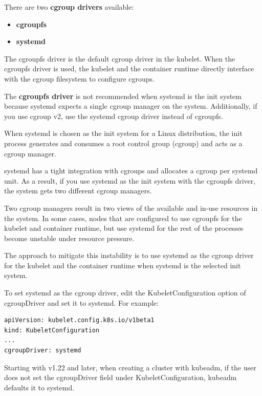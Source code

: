 \documentclass{article}
\newenvironment{blocktemplateII}[1]{%
    \tcolorbox[beamer,%
    noparskip,breakable,
    colframe=Green,%
    colbacklower=LimeGreen!75!LightGreen,%
    title=#1]}%
    {\endtcolorbox}
\newenvironment{codetemplate}[1][]{%
  \mybasecolorbox[#1]
  \itshape
}{%
  \endmybasecolorbox
}
\begin{document}
There are two \textbf{cgroup drivers} available:
\begin{itemize}
    \item \textbf{cgroupfs}
    \item \textbf{systemd}
\end{itemize}

The cgroupfs driver is the default cgroup driver in the kubelet. When the cgroupfs driver is used, the kubelet and the container runtime directly interface with the cgroup filesystem to configure cgroups.

The \textbf{cgroupfs driver} is not recommended when systemd is the init system because systemd expects a single cgroup manager on the system. Additionally, if you use cgroup v2, use the systemd cgroup driver instead of cgroupfs.

When systemd is chosen as the init system for a Linux distribution, the init process generates and consumes a root control group (cgroup) and acts as a cgroup manager.

systemd has a tight integration with cgroups and allocates a cgroup per systemd unit. As a result, if you use systemd as the init system with the cgroupfs driver, the system gets two different cgroup managers.

Two cgroup managers result in two views of the available and in-use resources in the system. In some cases, nodes that are configured to use cgroupfs for the kubelet and container runtime, but use systemd for the rest of the processes become unstable under resource pressure.

The approach to mitigate this instability is to use systemd as the cgroup driver for the kubelet and the container runtime when systemd is the selected init system.

To set systemd as the cgroup driver, edit the KubeletConfiguration option of cgroupDriver and set it to systemd. For example:

\begin{codetemplate}{}
\begin{verbatim}
apiVersion: kubelet.config.k8s.io/v1beta1
kind: KubeletConfiguration
...
cgroupDriver: systemd
\end{verbatim}
\end{codetemplate}

\begin{blocktemplateII}{NOTE}
Starting with v1.22 and later, when creating a cluster with kubeadm, if the user does not set the cgroupDriver field under KubeletConfiguration, kubeadm defaults it to systemd.
\end{blocktemplateII}
\end{document}
